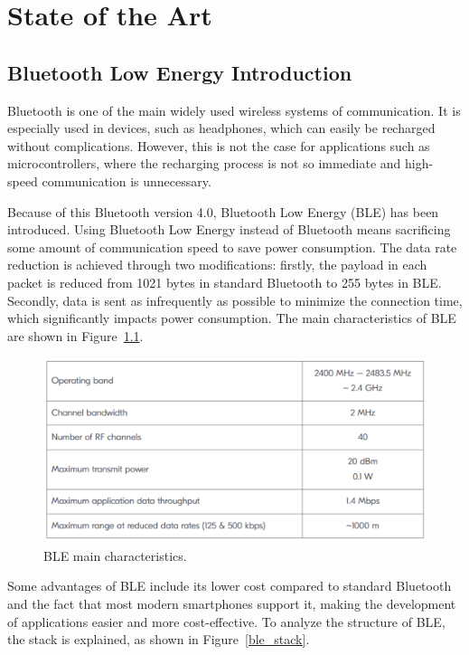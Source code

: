 \documentclass{Configuration_Files/PoliMi3i_thesis}
\begin{document}
\chapter{State of the Art}

\section{Bluetooth Low Energy Introduction}

Bluetooth is one of the main widely used wireless systems of communication. It is especially used in devices, such as headphones, which can easily be recharged without complications. However, this is not the case for applications such as microcontrollers, where the recharging process is not so immediate and high-speed communication is unnecessary. 

Because of this Bluetooth version 4.0, Bluetooth Low Energy (BLE) has been introduced. Using Bluetooth Low Energy instead of Bluetooth means sacrificing some amount of communication speed to save power consumption. The data rate reduction is achieved through two modifications: firstly, the payload in each packet is reduced from 1021 bytes in standard Bluetooth to 255 bytes in BLE. Secondly, data is sent as infrequently as possible to minimize the connection time, which significantly impacts power consumption. The main characteristics of BLE are shown in Figure~\ref{ble_char}.

\begin{figure}[h]
    \centering
    \includegraphics[width=\linewidth]{Bluetooth Low Energy/Screenshot 2024-08-15 at 23.25.43.png}
    \caption{BLE main characteristics. \cite{WhatBluetooth}}
    \label{ble_char}
\end{figure}

Some advantages of BLE include its lower cost compared to standard Bluetooth and the fact that most modern smartphones support it, making the development of applications easier and more cost-effective. To analyze the structure of BLE, the stack is explained, as shown in Figure~\ref{ble_stack}.
\end{document}
